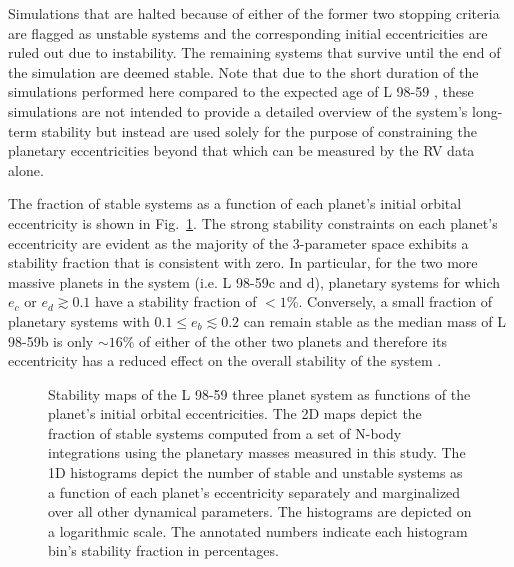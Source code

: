 \documentclass[longauth]{aa}
\begin{document}
\noindent Simulations that are halted because of either of the former two stopping criteria are flagged as unstable systems and the corresponding initial eccentricities are ruled out due to instability. The remaining systems that survive until the end of the simulation are deemed stable. Note that due to the short duration of the simulations performed here compared to the expected age of L 98-59 , these simulations are not intended to provide a detailed overview of the system's long-term stability but instead are used solely for the purpose of constraining the planetary eccentricities beyond that which can be measured by the RV data alone.

The fraction of stable systems as a function of each planet's initial orbital eccentricity is shown in Fig.~\ref{fig:stable}. The strong stability constraints on each planet's eccentricity are evident as the majority of the 3-parameter space exhibits a stability fraction that is consistent with zero. In particular,
for the two more massive planets in the system (i.e. L 98-59c and d), planetary systems for which $e_c$ or $e_d \gtrsim 0.1$ have a stability fraction of $<1$\%. Conversely, a small fraction of planetary systems with $0.1 \leq e_b \lesssim 0.2$ can remain stable as the median mass of L 98-59b is only $\sim 16$\% of either of the other two planets and therefore its eccentricity has a reduced effect on the overall stability of the system \citep{barnes06}. 

\begin{figure}
    \centering
    \caption{Stability maps of the L 98-59 three planet system as functions of the planet's initial orbital eccentricities. The 2D maps depict the fraction of stable systems computed from a set of N-body integrations using the planetary masses measured in this study. The 1D histograms depict the number of stable and unstable systems as a function of each planet's eccentricity separately and marginalized over all other dynamical parameters. The histograms are depicted on a logarithmic scale. The annotated numbers indicate each histogram bin's stability fraction in percentages.}
    \label{fig:stable}
\end{figure}
\end{document}
